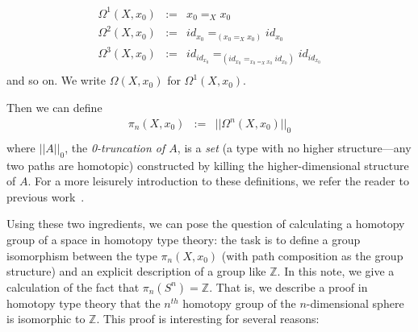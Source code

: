 \[
\begin{array}{rcl}
\Omega^1(X,x_0) & := & x_0 =_X x_0 \\
\Omega^2(X,x_0) & := & id_{{x_0}} =_{{(x_0 =_X x_0)}} id_{{x_0}} \\
\Omega^3(X,x_0) & := & id_{{id_{x_0}}} =_{(id_{{x_0}} =_{{x_0 =_X x_0}} id_{{x_0}})} id_{{id_{x_0}}} \\
\end{array}
\]
and so on.  We write $\Omega(X,x_0)$ for $\Omega^1(X,x_0)$.  

Then we can define 
\[
\begin{array}{rcl}
\pi_n(X,x_0) & := & ||\Omega^n(X,x_0)||_0 \\
\end{array}
\]
where $||A||_0$, the \emph{0-truncation of $A$}, is a \emph{set} (a type
with no higher structure---any two paths are homotopic) constructed by
killing the higher-dimensional structure of $A$.  For a more leisurely
introduction to these definitions, we refer the reader to previous work~\citep{ls13pi1s1,uf13hott-book}.

Using these two ingredients, we can pose the question of calculating a
homotopy group of a space in homotopy type theory: the task is to define
a group isomorphism between the type $\pi_n(X,x_0)$ (with path
composition as the group structure) and an explicit description of a
group like $\mathbb{Z}$.  In this note, we give a calculation of the
fact that $\pi_n(S^n) = \mathbb{Z}$. That is, we describe a proof in
homotopy type theory that the $n^{th}$ homotopy group of the
$n$-dimensional sphere is isomorphic to $\mathbb{Z}$.  This proof is
interesting for several reasons:

